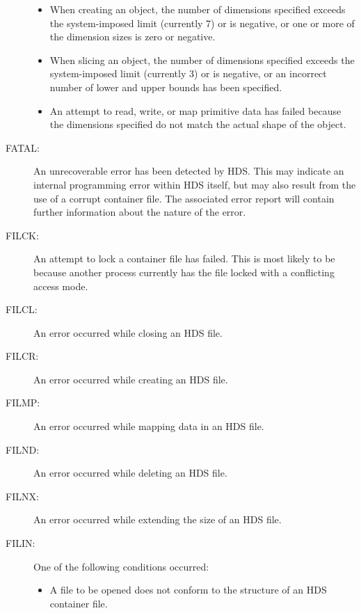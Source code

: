 \documentclass[11pt]{article}
\newcommand{\htmlref}[2]{#1}
\begin{document}
\begin{description}
\begin{itemize}
\item When creating an object, the number of dimensions specified exceeds the
system-imposed limit (currently 7) or is negative, or one or more of the
dimension sizes is zero or negative.

\item When slicing an object, the number of dimensions specified exceeds the
system-imposed limit (currently 3) or is negative, or an incorrect number of
lower and upper bounds has been specified.

\item An attempt to read, write, or map primitive data has failed because the
dimensions specified do not match the actual \htmlref{shape}{sect:shape} of the object.

\end{itemize}

\item [FATAL:]
An unrecoverable error has been detected by HDS. This may indicate an internal
programming error within HDS itself, but may also result from the use of a
corrupt container file. The associated error report will contain further
information about the nature of the error.

\item [FILCK:]
An attempt to lock a container file has failed. This is most likely to be
because another process currently has the file locked with a conflicting access
mode.

\item [FILCL:]
An error occurred while closing an HDS file.

\item [FILCR:]
An error occurred while creating an HDS file.

\item [FILMP:]
An error occurred while mapping data in an HDS file.

\item [FILND:]
An error occurred while deleting an HDS file.

\item [FILNX:]
An error occurred while extending the size of an HDS file.

\item [FILIN:]
One of the following conditions occurred:
\begin{itemize}

\item A file to be opened does not conform to the structure of an HDS container
file.


\end{itemize}
\end{description}
\end{document}
